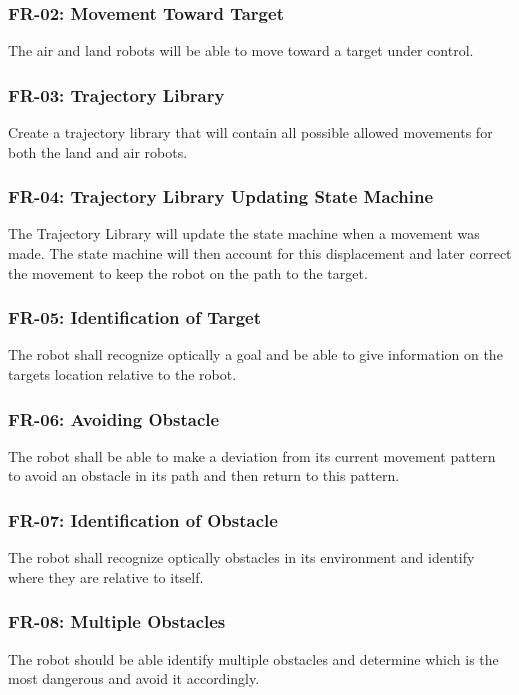 \documentclass{article}
\begin{document}
		\subsubsection{FR-02: Movement Toward Target}
		The air and land robots will be able to move toward a target under control.
		
		\subsubsection{FR-03: Trajectory Library}
		Create a trajectory library that will contain all possible allowed movements for both the land and air robots.
		
		\subsubsection{FR-04: Trajectory Library Updating State Machine}
		The Trajectory Library will update the state machine when a movement was made. The state machine will then account for this displacement and later correct the movement to keep the robot on the path to the target.
		
		\subsubsection{FR-05: Identification of Target}
		The robot shall recognize optically a goal and be able to give information on the targets location relative to the robot. 
		
		\subsubsection{FR-06: Avoiding Obstacle}
		The robot shall be able to make a deviation from its current movement pattern to avoid an obstacle in its path and then return to this pattern.
		
		\subsubsection{FR-07: Identification of Obstacle}
		The robot shall recognize optically obstacles in its environment and identify where they are relative to itself.
		
		\subsubsection{FR-08: Multiple Obstacles}
		The robot should be able identify multiple obstacles and determine which is the most dangerous and avoid it accordingly. 
		
\end{document}
